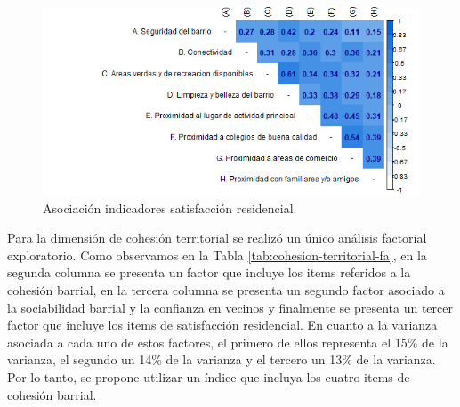 \documentclass[
  12pt,
]{book}
\begin{document}
\begin{figure}[H]

{\centering \includegraphics[width=1\linewidth,height=1\textheight]{output/graphs/satisfaccion-residencial_cor} 

}

\caption{Asociación indicadores satisfacción residencial.}\label{fig:satisfaccion-residencial-cor}
\end{figure}

Para la dimensión de cohesión territorial se realizó un único análisis factorial exploratorio. Como observamos en la Tabla \ref{tab:cohesion-territorial-fa}, en la segunda columna se presenta un factor que incluye los items referidos a la cohesión barrial, en la tercera columna se presenta un segundo factor asociado a la sociabilidad barrial y la confianza en vecinos y finalmente se presenta un tercer factor que incluye los items de satisfacción residencial. En cuanto a la varianza asociada a cada uno de estos factores, el primero de ellos representa el 15\% de la varianza, el segundo un 14\% de la varianza y el tercero un 13\% de la varianza. Por lo tanto, se propone utilizar un índice que incluya los cuatro items de cohesión barrial.
\end{document}
